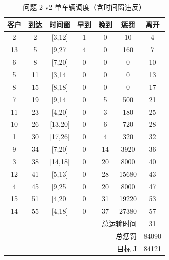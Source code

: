 \begin{table}[htbp]
\centering
\caption{问题 2 v2 单车辆调度（含时间窗违反）}\label{tab:q2_v2_schedule}
\begin{tabular}{ccccccc}
\toprule
客户 & 到达 & 时间窗 & 早到 & 晚到 & 惩罚 & 离开 \\
\midrule
2 & 2 & [3,12] & 1 & 0 & 10 & 4 \\
13 & 5 & [9,27] & 4 & 0 & 160 & 7 \\
6 & 8 & [7,20] & 0 & 0 & 0 & 10 \\
5 & 11 & [3,14] & 0 & 0 & 0 & 13 \\
8 & 15 & [8,18] & 0 & 0 & 0 & 17 \\
7 & 19 & [9,14] & 0 & 5 & 500 & 21 \\
11 & 23 & [4,20] & 0 & 3 & 180 & 25 \\
10 & 26 & [13,20] & 0 & 6 & 720 & 28 \\
1 & 30 & [17,26] & 0 & 4 & 320 & 32 \\
9 & 34 & [7,20] & 0 & 14 & 3920 & 36 \\
3 & 38 & [14,18] & 0 & 20 & 8000 & 40 \\
12 & 41 & [5,13] & 0 & 28 & 15680 & 43 \\
4 & 45 & [9,25] & 0 & 20 & 8000 & 47 \\
15 & 51 & [4,20] & 0 & 31 & 19220 & 53 \\
14 & 55 & [4,18] & 0 & 37 & 27380 & 57 \\
\midrule
\multicolumn{6}{r}{总运输时间} & 31 \\
\multicolumn{6}{r}{总惩罚} & 84090 \\
\multicolumn{6}{r}{目标 J} & 84121 \\
\bottomrule
\end{tabular}
\end{table}
